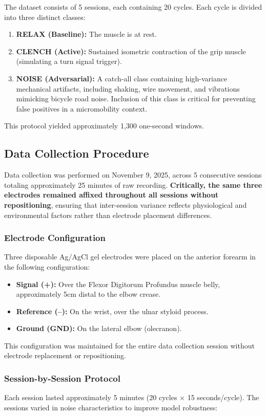 \documentclass{article}
\begin{document}
The dataset consists of 5 sessions, each containing 20 cycles. Each cycle is divided into three distinct classes:
\begin{enumerate}
    \item \textbf{RELAX (Baseline):} The muscle is at rest.
    \item \textbf{CLENCH (Active):} Sustained isometric contraction of the grip muscle (simulating a turn signal trigger).
    \item \textbf{NOISE (Adversarial):} A catch-all class containing high-variance mechanical artifacts, including shaking, wire movement, and vibrations mimicking bicycle road noise. Inclusion of this class is critical for preventing false positives in a micromobility context.
\end{enumerate}

This protocol yielded approximately 1,300 one-second windows.

\subsection{Data Collection Procedure}
Data collection was performed on November 9, 2025, across 5 consecutive sessions totaling approximately 25 minutes of raw recording. \textbf{Critically, the same three electrodes remained affixed throughout all sessions without repositioning}, ensuring that inter-session variance reflects physiological and environmental factors rather than electrode placement differences.

\subsubsection{Electrode Configuration}
Three disposable Ag/AgCl gel electrodes were placed on the anterior forearm in the following configuration:
\begin{itemize}
    \item \textbf{Signal (+):} Over the Flexor Digitorum Profundus muscle belly, approximately 5cm distal to the elbow crease.
    \item \textbf{Reference (--):} On the wrist, over the ulnar styloid process.
    \item \textbf{Ground (GND):} On the lateral elbow (olecranon).
\end{itemize}
This configuration was maintained for the entire data collection session without electrode replacement or repositioning.

\subsubsection{Session-by-Session Protocol}
Each session lasted approximately 5 minutes (20 cycles $\times$ 15 seconds/cycle). The sessions varied in noise characteristics to improve model robustness:
\end{document}
